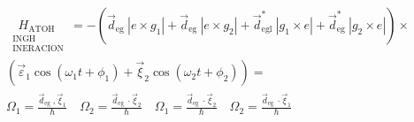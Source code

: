$$
\begin{aligned}
& \underset{\substack{\text { INGH } \\
\text { INERACION }}}{H_{\text {ATOH }}}=-\left(\vec{d}_{\text {eg }}\left|e \times g_{1}\right|+\vec{d}_{\text {eg }}\left|e \times g_{2}\right|+\vec{d}_{\text {egl }}^{*}\left|g_{1} \times e\right|+\vec{d}_{\text {eg }}^{*}\left|g_{2} \times e\right|\right) \times \\
&\left(\vec{\varepsilon}_{1} \cos \left(\omega_{1} t+\phi_{1}\right)+\vec{\xi}_{2} \cos \left(\omega_{2} t+\phi_{2}\right)\right)= \\
& \Omega_{1}=\frac{\vec{d}_{\text {eg }}, \vec{\xi}_{1}}{\hbar} \quad \Omega_{2}=\frac{\vec{d}_{\text {eg }} \cdot \vec{\xi}_{2}}{\hbar} \quad \Omega_{1}=\frac{\vec{d}_{\text {eg }} \cdot \vec{\xi}_{2}}{\hbar} \quad \Omega_{2}=\frac{\vec{d}_{\text {eg }} \cdot \vec{\xi}_{1}}{\hbar}
\end{aligned}
$$

